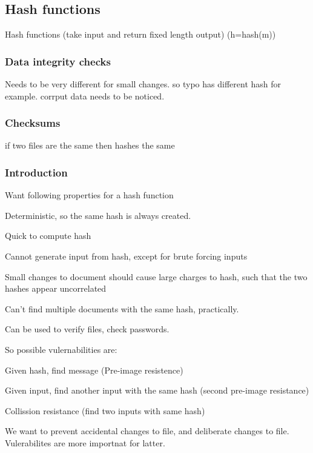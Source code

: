 
\subsection{Hash functions}

Hash functions (take input and return fixed length output) (h=hash(m))	

\subsubsection{Data integrity checks}

Needs to be very different for small changes. so typo has different hash for example. corrput data needs to be noticed.

\subsubsection{Checksums}

if two files are the same then hashes the same

\subsubsection{Introduction}

Want following properties for a hash function

Deterministic, so the same hash is always created.

Quick to compute hash

Cannot generate input from hash, except for brute forcing inputs

Small changes to document should cause large charges to hash, such that the two hashes appear uncorrelated

Can't find multiple documents with the same hash, practically.

Can be used to verify files, check passwords.

So possible vulernabilities are:

Given hash, find message (Pre-image resistence)

Given input, find another input with the same hash (second pre-image resistance)

Collission resistance (find two inputs with same hash)

We want to prevent accidental changes to file, and deliberate changes to file. Vulerabilites are more importnat for latter.

